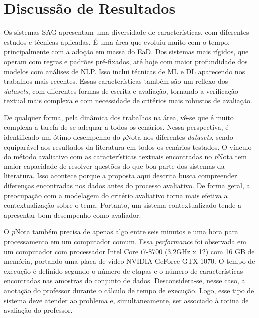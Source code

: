 \section{Discussão de Resultados}
\label{sec-discussao}

Os sistemas SAG apresentam uma diversidade de características, com diferentes estudos e técnicas aplicadas. É uma área que evoluiu muito com o tempo, principalmente com a adoção em massa do EaD. Dos sistemas mais rígidos, que operam com regras e padrões pré-fixados, até hoje com maior profundidade dos modelos com análises de NLP. Isso inclui técnicas de ML e DL aparecendo nos trabalhos mais recentes. Essas características também são um reflexo dos \textit{datasets}, com diferentes formas de escrita e avaliação, tornando a verificação textual mais complexa e com necessidade de critérios mais robustos de avaliação.

De qualquer forma, pela dinâmica dos trabalhos na área, vê-se que é muito complexa a tarefa de se adequar a todos os cenários. Nessa perspectiva, é identificado um ótimo desempenho do \textit{p}Nota nos diferentes \textit{datasets}, sendo equiparável aos resultados da literatura em todos os cenários testados. O vínculo do método avaliativo com as características textuais encontradas no \textit{p}Nota tem maior capacidade de resolver questões do que boa parte dos sistemas da literatura. Isso acontece porque a proposta aqui descrita busca compreender diferenças encontradas nos dados antes do processo avaliativo. De forma geral, a preocupação com a modelagem do critério avaliativo torna mais efetiva a contextualização sobre o tema. Portanto, um sistema contextualizado tende a apresentar bom desempenho como avaliador.

O \textit{p}Nota também precisa de apenas algo entre seis minutos e uma hora para processamento em um computador comum. Essa \textit{performance} foi observada em um computador com processador Intel Core i7-8700 (3,2GHz x 12) com 16 GB de memória, portando uma placa de vídeo NVIDIA GeForce GTX 1070. O tempo de execução é definido segundo o número de etapas e o número de características encontradas nas amostras do conjunto de dados. Desconsidera-se, nesse caso, a anotação do professor durante o cálculo de tempo de execução. Logo, esse tipo de sistema deve atender ao problema e, simultaneamente, ser associado à rotina de avaliação do professor.

